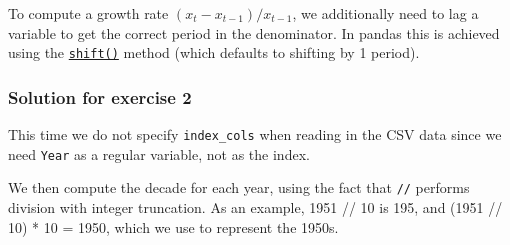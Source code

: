 \documentclass{scrartcl}
\begin{document}
\begin{enumerate}
  To compute a growth rate \((x_t - x_{t-1})/x_{t-1}\), we additionally
  need to lag a variable to get the correct period in the denominator.
  In pandas this is achieved using the
  \href{https://pandas.pydata.org/pandas-docs/stable/reference/api/pandas.DataFrame.shift.html}{\texttt{shift()}}
  method (which defaults to shifting by 1 period).
\end{enumerate}

    \hypertarget{solution-for-exercise-2}{%
\subsubsection{Solution for exercise 2}\label{solution-for-exercise-2}}

This time we do not specify \texttt{index\_cols} when reading in the CSV
data since we need \texttt{Year} as a regular variable, not as the
index.

We then compute the decade for each year, using the fact that
\texttt{//} performs division with integer truncation. As an example,
1951 // 10 is 195, and (1951 // 10) * 10 = 1950, which we use to
represent the 1950s.
\end{document}
